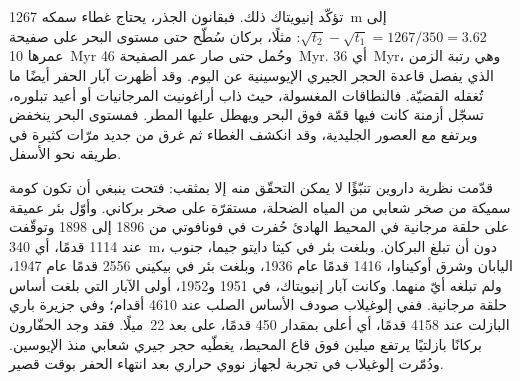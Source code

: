 تؤكّد إنيويتاك ذلك. فبقانون الجذر، يحتاج غطاء سمكه \qty{1267}{m} إلى $\sqrt{t_2} - \sqrt{t_1} =
1267/350 = 3.62$: مثلًا، بركان سُطّح حتى مستوى البحر على صفيحة عمرها \qty{10}{Myr}
وحُمل حتى صار عمر الصفيحة \qty{46}{Myr}. أي \qty{36}{Myr}، وهي رتبة الزمن الذي
يفصل قاعدة الحجر الجيري الإيوسينية عن اليوم. وقد أظهرت آبار الحفر أيضًا ما
تُغفله القضيّة. فالنطاقات المغسولة، حيث ذاب أراغونيت المرجانيات أو
أعيد تبلوره، تسجّل أزمنة كانت فيها قمّة  فوق البحر ويهطل عليها المطر.
فمستوى البحر ينخفض ويرتفع مع العصور الجليدية، وقد انكشف الغطاء ثم غرق من جديد مرّات
كثيرة في طريقه نحو الأسفل.

\begin{history}
قدّمت نظرية داروين تنبّؤًا لا يمكن التحقّق منه إلا بمثقب: فتحت  ينبغي
أن تكون كومة سميكة من صخر شعابي من المياه الضحلة، مستقرّة على صخر بركاني. وأوّل بئر عميقة
على حلقة مرجانية في المحيط الهادئ حُفرت في فونافوتي من 1896 إلى 1898 وتوقّفت عند 1114 قدمًا،
أي \qty{340}{m}، دون أن تبلغ البركان. وبلغت بئر في كيتا دايتو جيما، جنوب اليابان وشرق أوكيناوا،
1416 قدمًا عام 1936، وبلغت بئر في بيكيني 2556 قدمًا عام 1947، ولم تبلغه أيّ منهما. وكانت آبار إنيويتاك، في
1951 و1952، أولى الآبار التي بلغت أساس حلقة مرجانية. ففي إلوغيلاب صودف الأساس الصلب
عند 4610 أقدام؛ وفي جزيرة باري البازلت عند 4158 قدمًا، أي أعلى بمقدار 450 قدمًا، على بعد \num{22}~ميلًا.
فقد وجد الحفّارون بركانًا بازلتيًا يرتفع ميلين فوق قاع المحيط، يغطّيه
حجر جيري شعابي منذ الإيوسين. ودُمّرت إلوغيلاب في تجربة لجهاز نووي حراري
بعد انتهاء الحفر بوقت قصير.
\end{history}

